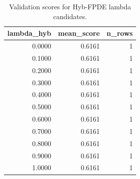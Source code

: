 \begin{table}[t]
\caption{Validation scores for Hyb-FPDE lambda candidates.}
\label{tab:lambda_distribution_computed}
\centering
\begin{tabular}{rrr}
\toprule
lambda\_hyb & mean\_score & n\_rows \\
\midrule
0.0000 & 0.6161 & 1 \\
0.1000 & 0.6161 & 1 \\
0.2000 & 0.6161 & 1 \\
0.3000 & 0.6161 & 1 \\
0.4000 & 0.6161 & 1 \\
0.5000 & 0.6161 & 1 \\
0.6000 & 0.6161 & 1 \\
0.7000 & 0.6161 & 1 \\
0.8000 & 0.6161 & 1 \\
0.9000 & 0.6161 & 1 \\
1.0000 & 0.6161 & 1 \\
\bottomrule
\end{tabular}

\end{table}
